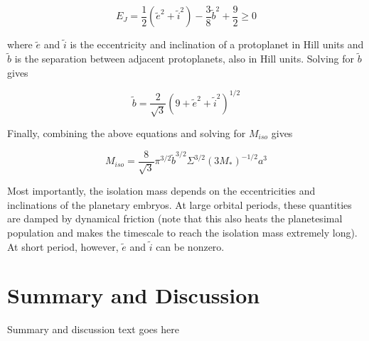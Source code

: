 \documentclass[onecolumn]{aastex63}
\begin{document}
\begin{equation}
    E_{J} = \frac{1}{2} \left( \tilde{e}^{2} + \tilde{i}^{2} \right) - \frac{3}{8} \tilde{b}^{2} + \frac{9}{2}  \geq 0
\end{equation}

\noindent where $\tilde{e}$ and  $\tilde{i}$ is the eccentricity and inclination of a protoplanet in Hill units and $\tilde{b}$ is the separation between adjacent protoplanets, also in Hill units. Solving for $\tilde{b}$ gives

\begin{equation}
    \tilde{b} = \frac{2}{\sqrt{3}} \left( 9 + \tilde{e}^{2} + \tilde{i}^{2} \right)^{1/2}
\end{equation}

Finally, combining the above equations and solving for $M_{iso}$ gives

\begin{equation}
    M_{iso} = \frac{8}{\sqrt{3}} \pi^{3/2} \tilde{b}^{3/2} \Sigma^{3/2} \left( 3 M_{*} \right)^{-1/2} a^{3}
\end{equation}

Most importantly, the isolation mass depends on the eccentricities and inclinations of the planetary embryos. At large orbital periods, these quantities are damped by dynamical friction (note that this also heats the planetesimal population and makes the timescale to reach the isolation mass extremely long). At short period, however, $\tilde{e}$ and  $\tilde{i}$ can be nonzero.

\section{Summary and Discussion} \label{sec:discuss}

Summary and discussion text goes here



\clearpage
\end{document}
